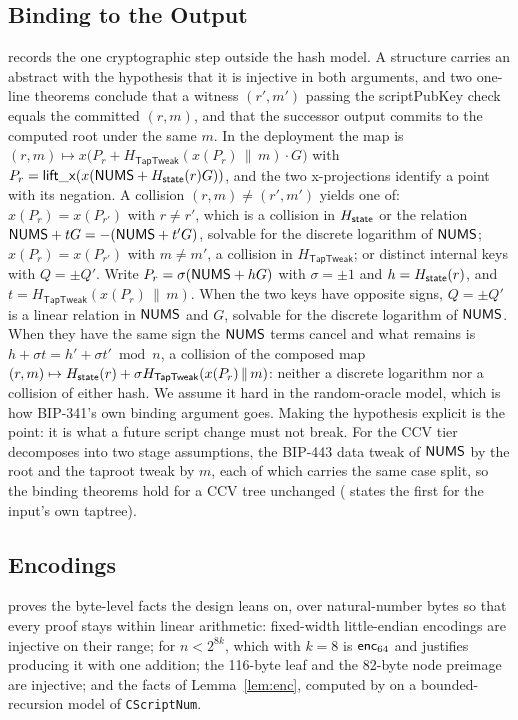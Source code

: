 \subsection{Binding to the Output}

 records the one cryptographic step outside the hash
model. A structure  carries an abstract
 with the hypothesis that it is
injective in both arguments, and two one-line theorems conclude that a
witness $(r', m')$ passing the scriptPubKey check equals the committed
$(r, m)$, and that the successor output commits to the computed root under
the same $m$. In the deployment the map is
$(r, m) \mapsto x\bigl(P_r + H_{\mathsf{TapTweak}}(x(P_r) \,\|\, m)\cdot G\bigr)$
with $P_r = \mathsf{lift\_x}(x(\mathsf{NUMS} + H_{\mathsf{state}}(r) G))$, and the two
x-projections identify a point with its negation. A collision
$(r, m) \ne (r', m')$ yields one of: $x(P_r) = x(P_{r'})$ with $r \ne r'$,
which is a collision in $H_{\mathsf{state}}$ or the relation
$\mathsf{NUMS} + tG = -(\mathsf{NUMS} + t'G)$, solvable for the discrete logarithm of
$\mathsf{NUMS}$; $x(P_r) = x(P_{r'})$ with $m \ne m'$, a collision in
$H_{\mathsf{TapTweak}}$; or distinct internal keys with $Q = \pm Q'$.
Write $P_r = \sigma(\mathsf{NUMS} + h G)$ with $\sigma = \pm 1$ and
$h = H_{\mathsf{state}}(r)$, and $t = H_{\mathsf{TapTweak}}(x(P_r) \,\|\, m)$. When
the two keys have opposite signs, $Q = \pm Q'$ is a linear relation in
$\mathsf{NUMS}$ and $G$, solvable for the discrete logarithm of $\mathsf{NUMS}$. When
they have the same sign the $\mathsf{NUMS}$ terms cancel and what remains is
$h + \sigma t = h' + \sigma t' \bmod n$, a collision of the composed map
$(r, m) \mapsto H_{\mathsf{state}}(r) + \sigma H_{\mathsf{TapTweak}}(x(P_r) \,\|\, m)$:
neither a discrete logarithm nor a collision of either hash. We assume it
hard in the random-oracle model, which is how BIP-341's own binding
argument goes. Making the hypothesis explicit is the point: it is what a
future script change must not break. For the CCV tier
 decomposes  into two stage
assumptions, the BIP-443 data tweak of $\mathsf{NUMS}$ by the root and the
taproot tweak by $m$, each of which carries the same case split, so the
binding theorems hold for a CCV tree unchanged (
states the first for the input's own taptree).


\subsection{Encodings}

 proves the byte-level facts the design leans on, over
natural-number bytes so that every proof stays within linear arithmetic:
fixed-width little-endian encodings are injective on their range;
 for $n < 2^{8k}$,
which with $k = 8$ is $\mathsf{enc}_{64}$ and justifies producing it with one
addition; the 116-byte leaf and the 82-byte node preimage are injective;
and the  facts of Lemma~\ref{lem:enc}, computed by
 on a bounded-recursion model of \texttt{CScriptNum}.



